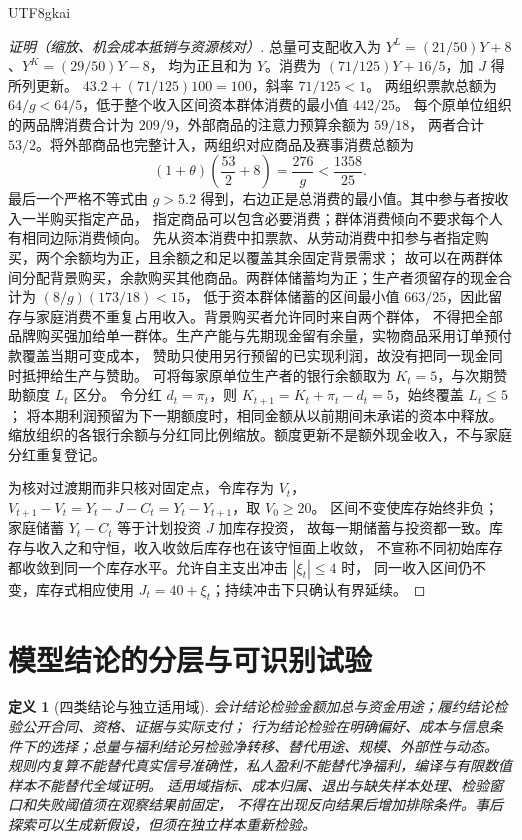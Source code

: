 \documentclass[12pt,a4paper,openany]{report}
\newtheorem{definition}{定义}[chapter]
\begin{document}
\begin{CJK*}{UTF8}{gkai}
\begin{proof}[证明（缩放、机会成本抵销与资源核对）]
总量可支配收入为 \(Y^L=(21/50)Y+8\)、\(Y^K=(29/50)Y-8\)，
均为正且和为 \(Y\)。消费为 \((71/125)Y+16/5\)，加 \(J\) 得所列更新。
\(43.2+(71/125)100=100\)，斜率 \(71/125<1\)。
两组织票款总额为 \(64/g<64/5\)，低于整个收入区间资本群体消费的最小值 \(442/25\)。
每个原单位组织的两品牌消费合计为 \(209/9\)，外部商品的注意力预算余额为 \(59/18\)，
两者合计 \(53/2\)。将外部商品也完整计入，两组织对应商品及赛事消费总额为
\[
 (1+\theta)\left(\frac{53}{2}+8\right)=\frac{276}{g}<\frac{1358}{25}.
\]
最后一个严格不等式由 \(g>5.2\) 得到，右边正是总消费的最小值。其中参与者按收入一半购买指定产品，
指定商品可以包含必要消费；群体消费倾向不要求每个人有相同边际消费倾向。
先从资本消费中扣票款、从劳动消费中扣参与者指定购买，两个余额均为正，且余额之和足以覆盖其余固定背景需求；
故可以在两群体间分配背景购买，余款购买其他商品。两群体储蓄均为正；生产者须留存的现金合计为 \((8/g)(173/18)<15\)，
低于资本群体储蓄的区间最小值 \(663/25\)，因此留存与家庭消费不重复占用收入。背景购买者允许同时来自两个群体，
不得把全部品牌购买强加给单一群体。生产产能与先期现金留有余量，实物商品采用订单预付款覆盖当期可变成本，
赞助只使用另行预留的已实现利润，故没有把同一现金同时抵押给生产与赞助。
可将每家原单位生产者的银行余额取为 \(K_t=5\)，与次期赞助额度 \(L_t\) 区分。
令分红 \(d_t=\pi_t\)，则 \(K_{t+1}=K_t+\pi_t-d_t=5\)，始终覆盖 \(L_t\le5\)；
将本期利润预留为下一期额度时，相同金额从以前期间未承诺的资本中释放。
缩放组织的各银行余额与分红同比例缩放。额度更新不是额外现金收入，不与家庭分红重复登记。

为核对过渡期而非只核对固定点，令库存为 \(V_t\)，
\(V_{t+1}-V_t=Y_t-J-C_t=Y_t-Y_{t+1}\)，取 \(V_0\ge20\)。
区间不变使库存始终非负；家庭储蓄 \(Y_t-C_t\) 等于计划投资 \(J\) 加库存投资，
故每一期储蓄与投资都一致。库存与收入之和守恒，收入收敛后库存也在该守恒面上收敛，
不宣称不同初始库存都收敛到同一个库存水平。允许自主支出冲击 \(|\xi_t|\le4\) 时，
同一收入区间仍不变，库存式相应使用 \(J_t=40+\xi_t\)；持续冲击下只确认有界延续。
\end{proof}

\section{模型结论的分层与可识别试验}
\label{sec:identified-validation}

\begin{definition}[四类结论与独立适用域]
会计结论检验金额加总与资金用途；履约结论检验公开合同、资格、证据与实际支付；
行为结论检验在明确偏好、成本与信息条件下的选择；总量与福利结论另检验净转移、替代用途、规模、外部性与动态。
规则内复算不能替代真实信号准确性，私人盈利不能替代净福利，编译与有限数值样本不能替代全域证明。
适用域指标、成本归属、退出与缺失样本处理、检验窗口和失败阈值须在观察结果前固定，
不得在出现反向结果后增加排除条件。事后探索可以生成新假设，但须在独立样本重新检验。
\end{definition}


\end{CJK*}
\end{document}

